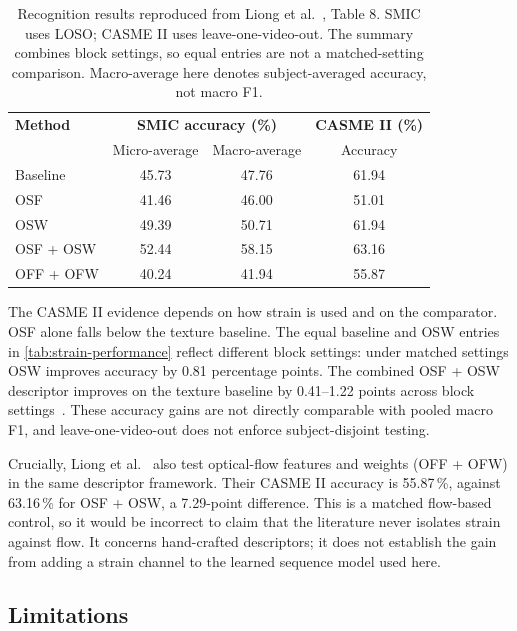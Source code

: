 \begin{table}[htbp]
    \centering
    \small
    \begin{tabular}{@{}lccc@{}}
        \hline
        \textbf{Method} & \multicolumn{2}{c}{\textbf{SMIC accuracy (\%)}} & \textbf{CASME II (\%)} \\
        & Micro-average & Macro-average & Accuracy \\
        \hline
        Baseline & 45.73 & 47.76 & 61.94 \\
        OSF & 41.46 & 46.00 & 51.01 \\
        OSW & 49.39 & 50.71 & 61.94 \\
        OSF + OSW & 52.44 & 58.15 & 63.16 \\
        OFF + OFW & 40.24 & 41.94 & 55.87 \\
        \hline
    \end{tabular}
    \caption[Recognition results for strain-based descriptors]{Recognition results reproduced from Liong et al.~\cite{liong2016}, Table 8. SMIC uses LOSO; CASME II uses leave-one-video-out. The summary combines block settings, so equal entries are not a matched-setting comparison. Macro-average here denotes subject-averaged accuracy, not macro F1.}
    \label{tab:strain-performance}
\end{table}

The CASME II evidence depends on how strain is used and on the comparator. OSF alone falls below the texture baseline. The equal baseline and OSW entries in \autoref{tab:strain-performance} reflect different block settings: under matched settings OSW improves accuracy by 0.81 percentage points. The combined OSF + OSW descriptor improves on the texture baseline by 0.41--1.22 points across block settings~\cite{liong2016}. These accuracy gains are not directly comparable with pooled macro F1, and leave-one-video-out does not enforce subject-disjoint testing.

Crucially, Liong et al.~\cite{liong2016} also test optical-flow features and weights (OFF + OFW) in the same descriptor framework. Their CASME II accuracy is 55.87\,\%, against 63.16\,\% for OSF + OSW, a 7.29-point difference. This is a matched flow-based control, so it would be incorrect to claim that the literature never isolates strain against flow. It concerns hand-crafted descriptors; it does not establish the gain from adding a strain channel to the learned sequence model used here.

\subsection{Limitations}
\label{sec:strain-limitations}

